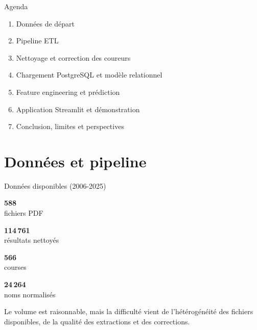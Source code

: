 \documentclass[aspectratio=169,11pt]{beamer}
\newcommand{\metric}[2]{%
  \begin{minipage}{0.22\textwidth}
    \centering
    {\Large\bfseries\color{condruBlue} #1}\\[-1mm]
    {\scriptsize #2}
  \end{minipage}
}
\begin{document}
\begin{frame}{Agenda}
  \begin{enumerate}
    \item Données de départ
    \item Pipeline ETL
    \item Nettoyage et correction des coureurs
    \item Chargement PostgreSQL et modèle relationnel
    \item Feature engineering et prédiction
    \item Application Streamlit et démonstration
    \item Conclusion, limites et perspectives
  \end{enumerate}
\end{frame}

\section{Données et pipeline}

\begin{frame}{Données disponibles (2006-2025)}
  \begin{center}
    \metric{588}{fichiers PDF}
    \metric{114\,761}{résultats nettoyés}
    \metric{566}{courses}
    \metric{24\,264}{noms normalisés}
  \end{center}
  \vspace{0.7cm}
  \begin{block}{}
    Le volume est raisonnable, mais la difficulté vient de l'hétérogénéité des fichiers disponibles, de la qualité des extractions et des corrections.
  \end{block}
\end{frame}
\end{document}
